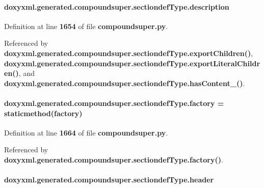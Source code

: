 \paragraph[{description}]{\setlength{\rightskip}{0pt plus 5cm}doxyxml.\+generated.\+compoundsuper.\+sectiondef\+Type.\+description}\label{classdoxyxml_1_1generated_1_1compoundsuper_1_1sectiondefType_a144d9ca144dd2237ef06d2974c5cb7d7}


Definition at line {\bf 1654} of file {\bf compoundsuper.\+py}.



Referenced by {\bf doxyxml.\+generated.\+compoundsuper.\+sectiondef\+Type.\+export\+Children()}, {\bf doxyxml.\+generated.\+compoundsuper.\+sectiondef\+Type.\+export\+Literal\+Children()}, and {\bf doxyxml.\+generated.\+compoundsuper.\+sectiondef\+Type.\+has\+Content\+\_\+()}.

\paragraph[{factory}]{\setlength{\rightskip}{0pt plus 5cm}doxyxml.\+generated.\+compoundsuper.\+sectiondef\+Type.\+factory = staticmethod(factory)\hspace{0.3cm}{\ttfamily [static]}}\label{classdoxyxml_1_1generated_1_1compoundsuper_1_1sectiondefType_a3b5bb6e53d659e5dfa10fa469e4f57fe}


Definition at line {\bf 1664} of file {\bf compoundsuper.\+py}.



Referenced by {\bf doxyxml.\+generated.\+compoundsuper.\+sectiondef\+Type.\+factory()}.

\paragraph[{header}]{\setlength{\rightskip}{0pt plus 5cm}doxyxml.\+generated.\+compoundsuper.\+sectiondef\+Type.\+header}\label{classdoxyxml_1_1generated_1_1compoundsuper_1_1sectiondefType_a8bc2e4f964466b799c93ffb3426ab8e1}


